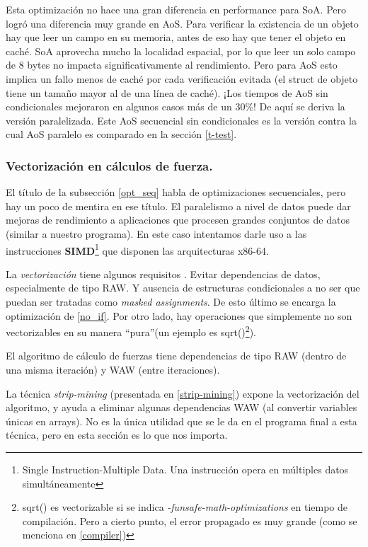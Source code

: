 \documentclass{article}
\begin{document}
Esta optimización no hace una gran diferencia en performance para SoA. Pero logró una diferencia muy grande en AoS. Para verificar la existencia de un objeto
hay que leer un campo en su memoria, antes de eso hay que tener el objeto en caché. SoA aprovecha mucho
la localidad espacial, por lo que leer un solo campo de 8 bytes no impacta significativamente al rendimiento. Pero para AoS esto
implica un fallo menos de caché por cada verificación evitada (el struct de objeto tiene un tamaño mayor al de una línea de caché). ¡Los tiempos
de AoS sin condicionales mejoraron en algunos casos más de un 30\%! De aquí se deriva la versión paralelizada. Este AoS
secuencial sin condicionales es la versión contra la cual AoS paralelo es comparado en la sección \ref{t-test}.

\subsubsection{Vectorización en cálculos de fuerza.\label{simd}}

El título de la subsección \ref{opt_seq} habla de optimizaciones secuenciales, pero hay un poco de mentira
en ese título. El paralelismo a nivel de datos puede dar mejoras de rendimiento a aplicaciones
que procesen grandes conjuntos de datos (similar a nuestro programa). En este caso intentamos darle uso a las
instrucciones \textbf{SIMD}\footnote{Single Instruction-Multiple Data. Una instrucción opera en múltiples datos simultáneamente} que disponen las arquitecturas x86-64.

La \textit{vectorización} tiene algunos requisitos \cite{intel_vec_guidelines}.
Evitar dependencias de datos, especialmente de tipo RAW. Y ausencia de estructuras condicionales a no ser
que puedan ser tratadas como \textit{masked assignments}. De esto último se encarga la optimización de \ref{no_if}.
Por otro lado, hay operaciones que simplemente no son vectorizables
en su manera ``pura''(un ejemplo es sqrt()\footnote{sqrt() es vectorizable si se indica \textit{-funsafe-math-optimizations}
en tiempo de compilación. Pero a cierto punto, el error propagado es muy grande (como se menciona en \ref{compiler})}).


El algoritmo de cálculo de fuerzas tiene dependencias de tipo RAW (dentro de una misma iteración) y WAW (entre iteraciones).

La técnica \textit{strip-mining} (presentada en \ref{strip-mining}) expone la vectorización
del algoritmo, y ayuda a eliminar algunas dependencias WAW (al convertir variables únicas en arrays). No es
la única utilidad que se le da en el programa final a esta técnica, pero en esta sección es lo que nos importa.
\end{document}
